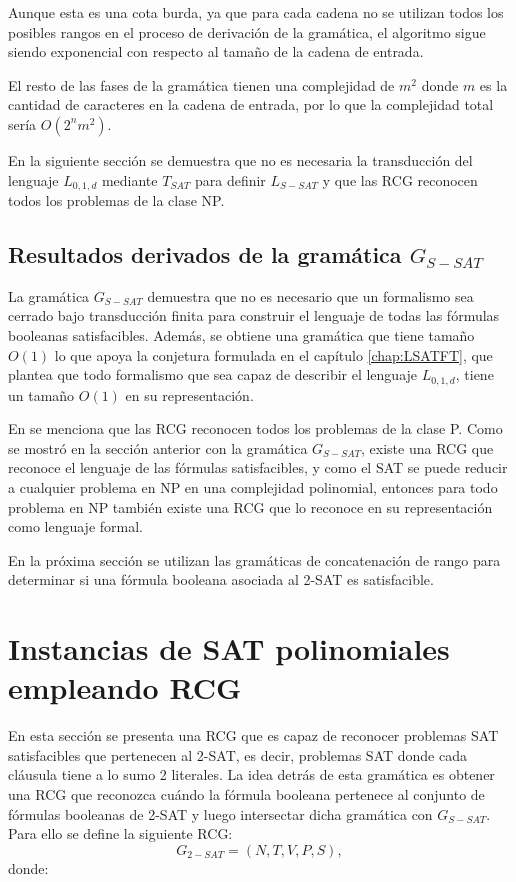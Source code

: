 Aunque esta es una cota burda, ya que para cada cadena no se utilizan todos los posibles rangos en el proceso de derivación de la gramática, el algoritmo sigue siendo exponencial con respecto al tamaño de la cadena de entrada.

El resto de las fases de la gramática tienen una complejidad de $m^2$ donde $m$
es la cantidad de caracteres en la cadena de entrada, por lo que la complejidad total sería $O(2^nm^2)$.

En la siguiente sección se demuestra que no es necesaria la transducción del lenguaje $L_{0,1,d}$ mediante $T_{SAT}$
para definir $L_{S-SAT}$ y que las RCG reconocen todos los problemas de la clase NP.
\subsection{Resultados derivados de la gramática $G_{S-SAT}$}

La gramática $G_{S-SAT}$ demuestra que no es necesario que un formalismo sea cerrado bajo transducción 
finita para construir el lenguaje de todas las fórmulas booleanas satisfacibles. Además, se obtiene una 
gramática que tiene tamaño $O(1)$ lo que apoya la conjetura formulada en el capítulo \ref{chap:LSATFT}, 
que plantea que todo formalismo que sea capaz de describir el lenguaje $L_{0,1,d}$, tiene un tamaño $O(1)$ en su representación.

En \cite{mainRCGBib} se menciona que las RCG reconocen todos los problemas de la clase P. Como se mostró en la sección anterior con la gramática $G_{S-SAT}$, existe una RCG que reconoce el lenguaje de las fórmulas satisfacibles, y como el SAT se puede reducir a cualquier problema en NP en una complejidad polinomial, entonces para todo problema en NP también existe una RCG que lo reconoce en su representación como lenguaje formal.

En la próxima sección se utilizan las gramáticas de concatenación de rango para determinar si una fórmula booleana asociada al 2-SAT es satisfacible.

\section{Instancias de SAT polinomiales empleando RCG}
\label{sec:pSATRCG}

En esta sección se presenta una RCG que es capaz de reconocer problemas SAT satisfacibles que pertenecen al 2-SAT, es decir, problemas SAT donde cada cláusula tiene a lo sumo 2 literales. La idea detrás de esta gramática es obtener una RCG que reconozca cuándo la fórmula booleana pertenece al conjunto de fórmulas booleanas de 2-SAT y luego intersectar dicha gramática con $G_{S-SAT}$.  Para ello se define la siguiente RCG:
\[
    G_{2-SAT} = (N, T, V, P, S),
\]
donde:

